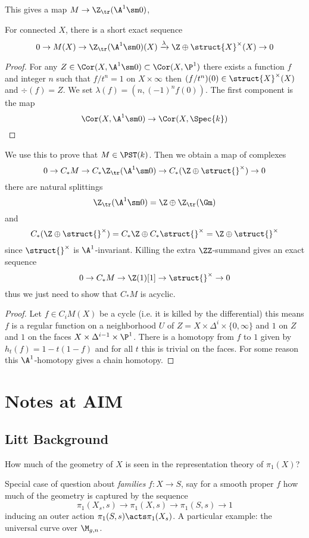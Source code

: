 \documentclass[12pt]{article}
\begin{document}
This gives a map $M \to \Z_{\tr}(\A^1 \sm 0)$,

\begin{lemma}
For connected $X$, there is a short exact sequence 
\[ 0 \to M(X) \to \Z_{\tr}(\A^1 \sm 0)(X) \xrightarrow{\lambda} \Z \oplus \struct{X}^\times(X) \to 0 \]
\end{lemma}

\begin{proof}
For any $Z \in \Cor(X, \A^1 \sm 0) \subset \Cor(X, \P^1)$ there exists a function $f$ and integer $n$ such that $f/t^n = 1$ on $X \times \infty$ then $(f/t^n)(0) \in \struct{X}^\times(X)$ and $\div(f) = Z$. We set $\lambda(f) = (n, (-1)^n f(0))$. The first component is the map
\[ \Cor(X, \A^1 \sm 0) \to \Cor(X, \Spec{k}) \]

\end{proof}

We use this to prove that $M \in \PST(k)$. Then we obtain a map of complexes
\[ 0 \to C_* M \to C_* \Z_{\tr}(\A^1 \sm 0) \to C_* (\Z \oplus \struct{}^\times) \to 0 \]
there are natural splittings
\[ \Z_{\tr}(\A^1 \sm 0) = \Z \oplus \Z_{\tr}(\Gm) \]
and
\[ C_*(\Z \oplus \struct{}^\times) = C_* \Z \oplus C_* \struct{}^\times = \Z \oplus \struct{}^\times \]
since $\struct{}^\times$ is $\A^1$-invariant. Killing the extra $\ZZ$-summand gives an exact sequence
\[ 0 \to C_* M \to \Z(1)[1] \to \struct{}^\times \to 0 \]
thus we just need to show that $C_* M$ is acyclic. 

\begin{proof}
Let $f \in C_i M(X)$ be a cycle (i.e. it is killed by the differential) this means $f$ is a regular function on a neighborhood $U$ of $Z = X \times \Delta^i \times \{ 0, \infty \}$ and $1$ on $Z$ and $1$ on the faces $X \times \Delta^{i-1} \times \P^1$. There is a homotopy from $f$ to $1$ given by $h_t(f) = 1 - t(1- f)$ and for all $t$ this is trivial on the faces. For some reason this $\A^1$-homotopy gives a chain homotopy.  
\end{proof}


\section{Notes at AIM}


\subsection{Litt Background}

How much of the geometry of $X$ is seen in the representation theory of $\pi_1(X)$?

Special case of question about \textit{families} $f : X \to S$, say for a smooth proper $f$ how much of the geometry is captured by the sequence
\[ \pi_1(X_s, s) \to \pi_1(X, s) \to \pi_1(S,s) \to 1 \]
inducing an outer action $\pi_1(S,s) \acts \pi_1(X_s)$.
A particular example: the universal curve over $\M_{g,n}$.
\end{document}
